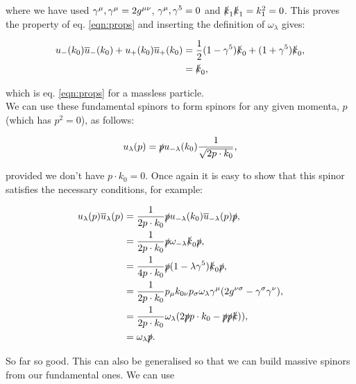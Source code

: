 		where we have used ${\gamma^{\mu}, \gamma^{\mu}}=2g^{\mu\nu}$, ${\gamma^{\mu}, \gamma^{5}}=0$ and $\slashed k_1\slashed k_1=k_1^2=0$.
		This proves the property of eq. \eqref{eqn:props} and inserting the definition of $\omega_\lambda$ gives:

		\begin{subequations}
		\begin{align*}
			u_-(k_0)\overline{u}_-(k_0) + u_+(k_0)\overline{u}_+(k_0) &= \frac{1}{2}(1-\gamma^{5})\slashed k_0 + (1+\gamma^{5})\slashed k_0,\\
			&= \slashed k_0,
		\end{align*}
		\end{subequations}

		which is eq. \eqref{eqn:props} for a massless particle.\\We can use these fundamental spinors
		to form spinors for any given momenta, $p$ (which has $p^2=0$), as follows:

		\begin{equation}
			u_\lambda(p) = \slashed p u_{-\lambda}(k_0) \frac{1}{\sqrt{2p\cdot k_0}},
		\end{equation}

		provided we don't have $p\cdot k_0=0$.  Once again it is easy to show that this spinor satisfies the necessary conditions, for example:

		\begin{subequations}
		\begin{align*}
			u_\lambda(p)\overline{u}_\lambda(p) &= \frac{1}{2p\cdot k_0}\slashed p u_{-\lambda}(k_0)\overline{u}_{-\lambda}(p)\slashed p,\\
			&= \frac{1}{2p\cdot k_0}\slashed p \omega_{-\lambda}\slashed k_0\slashed p,\\
			&= \frac{1}{4p\cdot k_0}\slashed p (1-\lambda\gamma^{5})\slashed k_0\slashed p,\\
			&= \frac{1}{2p\cdot k_0}p_{\mu}k_{0\nu}p_{\sigma}\omega_{\lambda}\gamma^{\mu}(2g^{\nu\sigma} - \gamma^{\sigma}\gamma^{\nu}),\\
			&= \frac{1}{2p\cdot k_0}\omega_\lambda(2\slashed p p\cdot k_0 - \slashed p\slashed p\slashed k)),\\
			&= \omega_\lambda\slashed p.\\
		\end{align*}
		\end{subequations}

		So far so good.  This can also be generalised so that we can build massive spinors from our fundamental ones.  We can use

